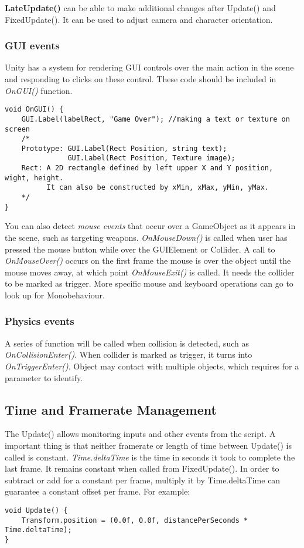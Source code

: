 \documentclass[10pt, a4paper]{article}
\begin{document}
                \textbf{LateUpdate()} can be able to make additional changes after Update() and FixedUpdate(). It can be used to adjust camera and character orientation. 
            \subsubsection{GUI events} 
                Unity has a system for rendering GUI controls over the main action in the scene and responding to clicks on these control. These code should be included in \emph{OnGUI()} function. 
\begin{lstlisting}
void OnGUI() {
    GUI.Label(labelRect, "Game Over"); //making a text or texture on screen
    /*
    Prototype: GUI.Label(Rect Position, string text);
               GUI.Label(Rect Position, Texture image);
    Rect: A 2D rectangle defined by left upper X and Y position, wight, height. 
          It can also be constructed by xMin, xMax, yMin, yMax. 
    */
}
\end{lstlisting}

                You can also detect \emph{mouse events} that occur over a GameObject as it appears in the scene, such as targeting weapons. \emph{OnMouseDown()} is called when user has pressed the mouse button while over the GUIElement or Collider. A call to \emph{OnMouseOver()} occurs on the first frame the mouse is over the object until the mouse moves away, at which point \emph{OnMouseExit()} is called. It needs the collider to be marked as trigger. More specific mouse and keyboard operations can go to look up for Monobehaviour.
            \subsubsection{Physics events}
                A series of function will be called when collision is detected, such as \emph{OnCollisionEnter()}. When collider is marked as trigger, it turns into \emph{OnTriggerEnter()}. Object may contact with multiple objects, which requires for a parameter to identify. 
        
        \subsection{Time and Framerate Management}
            The Update() allows monitoring inputs and other events from the script. A important thing is that neither framerate or length of time between Update() is called is constant. \emph{Time.deltaTime} is the time in seconds it took to complete the last frame. It remains constant when called from FixedUpdate(). In order to subtract or add for a constant per frame, multiply it by Time.deltaTime can guarantee a constant offset per frame. For example: 
\begin{lstlisting}
void Update() {
    Transform.position = (0.0f, 0.0f, distancePerSeconds * Time.deltaTime); 
}
\end{lstlisting}
\end{document}
